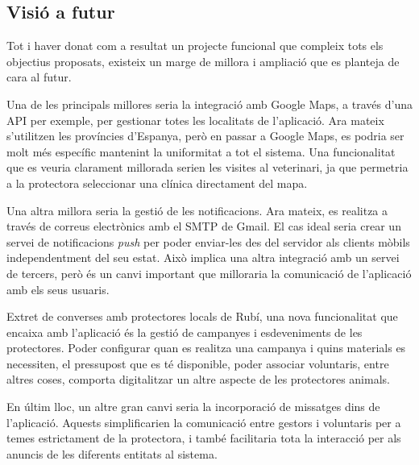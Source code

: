 \documentclass[11pt,a4paper]{report}
\begin{document}
\subsection{Visió a futur}
Tot i haver donat com a resultat un projecte funcional que compleix tots els objectius proposats, existeix un marge de millora i ampliació que es planteja de cara al futur.

Una de les principals millores seria la integració amb Google Maps, a través d'una API per exemple, per gestionar totes les localitats de l'aplicació. Ara mateix s'utilitzen les províncies d'Espanya, però en passar a Google Maps, es podria ser molt més específic mantenint la uniformitat a tot el sistema. Una funcionalitat que es veuria clarament millorada serien les visites al veterinari, ja que permetria a la protectora seleccionar una clínica directament del mapa.

Una altra millora seria la gestió de les notificacions. Ara mateix, es realitza a través de correus electrònics amb el SMTP de Gmail. El cas ideal seria crear un servei de notificacions \textit{push} per poder enviar-les des del servidor als clients mòbils independentment del seu estat. Això implica una altra integració amb un servei de tercers, però és un canvi important que milloraria la comunicació de l'aplicació amb els seus usuaris.

Extret de converses amb protectores locals de Rubí, una nova funcionalitat que encaixa amb l'aplicació és la gestió de campanyes i esdeveniments de les protectores. Poder configurar quan es realitza una campanya i quins materials es necessiten, el pressupost que es té disponible, poder associar voluntaris, entre altres coses, comporta digitalitzar un altre aspecte de les protectores animals.

En últim lloc, un altre gran canvi seria la incorporació de missatges dins de l'aplicació. Aquests simplificarien la comunicació entre gestors i voluntaris per a temes estrictament de la protectora, i també facilitaria tota la interacció per als anuncis de les diferents entitats al sistema.
\end{document}
